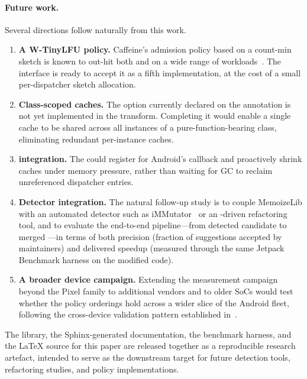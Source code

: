 \paragraph{Future work.}
Several directions follow naturally from this work.

\begin{enumerate}[leftmargin=*,nosep]
    \item \textbf{A W-TinyLFU policy.} Caffeine's admission policy based on a count-min sketch is known to out-hit both \lru and \lfu on a wide range of workloads~\cite{einziger2017tinylfu}. The  interface is ready to accept it as a fifth implementation, at the cost of a small per-dispatcher sketch allocation.
    \item \textbf{Class-scoped caches.} The  option currently declared on the annotation is not yet implemented in the transform. Completing it would enable a single cache to be shared across all instances of a pure-function-bearing class, eliminating redundant per-instance caches.
    \item \textbf{ integration.} The  could register for Android's  callback and proactively shrink caches under memory pressure, rather than waiting for GC to reclaim unreferenced dispatcher entries.
    \item \textbf{Detector integration.} The natural follow-up study is to couple MemoizeLib with an automated detector such as iMMutator~\cite{immutator} or an \llm-driven refactoring tool, and to evaluate the end-to-end pipeline---from detected candidate to merged \pr---in terms of both precision (fraction of suggestions accepted by maintainers) and delivered speedup (measured through the same Jetpack Benchmark harness on the modified code).
    \item \textbf{A broader device campaign.} Extending the measurement campaign beyond the Pixel family to additional vendors and to older SoCs would test whether the policy orderings hold across a wider slice of the Android fleet, following the cross-device validation pattern established in~\cite{empirical_rua}.
\end{enumerate}

The library, the Sphinx-generated documentation, the benchmark harness, and the \LaTeX{} source for this paper are released together as a reproducible research artefact, intended to serve as the downstream target for future detection tools, refactoring studies, and policy implementations.

